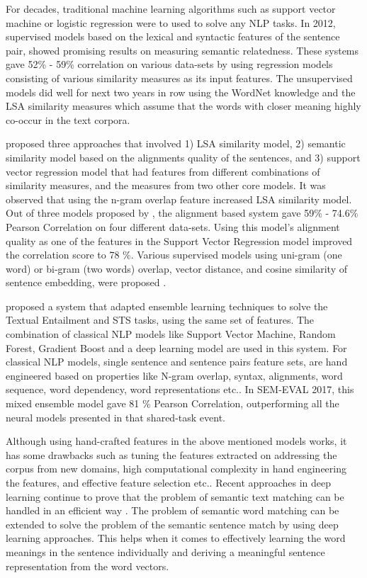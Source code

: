 \documentclass[12pt]{report} %
\begin{document}
For decades, traditional machine learning algorithms such as support vector machine or logistic regression were to used to solve any NLP tasks. In 2012, supervised models based on the lexical and syntactic features of the sentence pair, showed promising results on measuring semantic relatedness. These systems gave 52\% - 59\% correlation on various data-sets by using regression models consisting of various similarity measures as its input features. The unsupervised models did well for next two years in row using the WordNet knowledge and the LSA similarity measures which assume that the words with closer meaning highly co-occur in the text corpora. 

\cite{han2013umbc_ebiquity} proposed three approaches that involved 1) LSA similarity model, 2) semantic similarity model based on the alignments quality of the sentences, and 3) support vector regression model that had features from different combinations of similarity measures, and the measures from two other core models. It was observed that using the n-gram overlap feature increased LSA similarity model. Out of three models proposed by \cite{han2013umbc_ebiquity}, the alignment based system gave 59\% - 74.6\% Pearson Correlation on four different data-sets. Using this model's alignment quality as one of the features in the Support Vector Regression model improved the correlation score to 78 \%.  Various supervised models using uni-gram (one word) or bi-gram (two words) overlap, vector distance, and cosine similarity of sentence embedding, were proposed \citep{agirre2015semeval}.   

\cite{tian2017ecnu} proposed a system that adapted ensemble learning techniques to solve the Textual Entailment and STS tasks, using the same set of features. The combination of classical NLP models like Support Vector Machine, Random Forest, Gradient Boost and a deep learning model are used in this system. For classical NLP models, single sentence and sentence pairs feature sets, are hand engineered based on properties like N-gram overlap, syntax, alignments, word sequence, word dependency, word representations etc.. In SEM-EVAL 2017, this mixed ensemble model gave 81 \% Pearson Correlation, outperforming all the neural models presented in that shared-task event.

Although using hand-crafted features in the above mentioned models works, it has some drawbacks such as tuning the features extracted on addressing the corpus from new domains, high computational complexity in hand engineering the features, and effective feature selection etc.. Recent approaches in deep learning continue to prove that the problem of semantic text matching can be handled in an efficient way \citep{cer2017semeval}. The problem of semantic word matching can be extended to solve the problem of the semantic sentence match by using deep learning approaches. This helps when it comes to effectively learning the word meanings in the sentence individually and deriving a meaningful sentence representation from the word vectors.  
\end{document}
